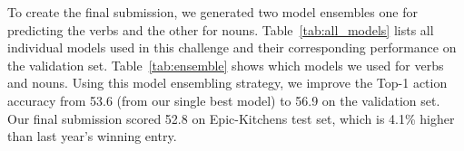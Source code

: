  To create the final submission, we generated two model ensembles one for predicting the verbs and the other for nouns. Table~\ref{tab:all_models} lists all individual models used in this challenge and their corresponding performance on the validation set. Table~\ref{tab:ensemble} shows which models we used for verbs and nouns. Using this model ensembling strategy, we improve the Top-1 action accuracy from 53.6 (from our single best model) to 56.9 on the validation set. Our final submission scored 52.8 on Epic-Kitchens test set, which is 4.1\% higher than last year's winning entry.

